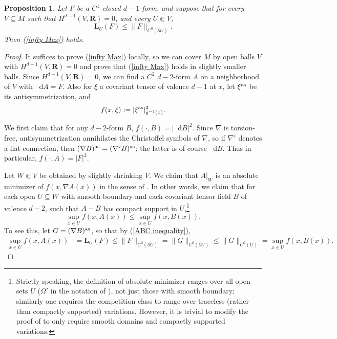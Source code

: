 \documentclass[reqno,11pt]{amsart}
\newcommand{\RR}{\mathbf{R}}
\newcommand*\dif{\mathop{}\!\mathrm{d}}
\newcommand{\Comass}{\mathbf L}
\newtheorem{proposition}[theorem]{Proposition}
\theoremstyle{definition}
\numberwithin{equation}{section}
\begin{document}
\begin{proposition}
Let $F$ be a $C^1$ closed $d - 1$-form, and suppose that for every $V \subseteq M$ such that $H^{d - 1}(V, \RR) = 0$, and every $U \Subset V$,
\begin{equation}\label{ABC inequality}
\Comass_U(F) \leq \|F\|_{C^0(\partial U)}.
\end{equation}
Then (\ref{infty Max}) holds.
\end{proposition}
\begin{proof}
It suffices to prove (\ref{infty Max}) locally, so we can cover $M$ by open balls $V$ with $H^{d - 1}(V, \RR) = 0$ and prove that (\ref{infty Max}) holds in slightly smaller balls.
Since $H^{d - 1}(V, \RR) = 0$, we can find a $C^2$ $d - 2$-form $A$ on a neighborhood of $\overline V$ with $\dif A = F$.
Also for $\xi$ a covariant tensor of valence $d - 1$ at $x$, let $\xi^{\rm as}$ be its antisymmetrization, and
$$f(x, \xi) := |\xi^{\rm as}|_{g^{-1}(x)}^2.$$

We first claim that for any $d - 2$-form $B$, $f(\cdot, B) = |\dif B|^2$.
Since $\nabla$ is torsion-free, antisymmetrization annihilates the Christoffel symbols of $\nabla$, so if $\nabla^\flat$ denotes a flat connection, then $(\nabla B)^{\rm as} = (\nabla^\flat B)^{\rm as}$; the latter is of course $\dif B$.
Thus in particular, $f(\cdot, A) = |F|^2$.

Let $W \Subset V$ be obtained by slightly shrinking $V$.
We claim that $A|_W$ is an absolute minimizer of $f(x, \nabla A(x))$ in the sense of \cite[Definition 5.1]{Barron2001}.
In other words, we claim that for each open $U \subseteq W$ with smooth boundary and each covariant tensor field $B$ of valence $d - 2$, such that $A - B$ has compact support in $U$,\footnote{Strictly speaking, the definition of absolute minimizer ranges over all open sets $U$ ($\Omega'$ in the notation of \cite{Barron2001}), not just those with smooth boundary; similarly one requires the competition class to range over traceless (rather than compactly supported) variations. However, it is trivial to modify the proof of \cite[Theorem 5.2]{Barron2001} to only require smooth domains and compactly supported variations.}
$$\sup_{x \in U} f(x, A(x)) \leq \sup_{x \in U} f(x, B(x)).$$
To see this, let $G = (\nabla B)^{\rm as}$, so that by (\ref{ABC inequality}),
\begin{align*}
\sup_{x \in U} f(x, A(x))
&= \Comass_U(F) \leq \|F\|_{C^0(\partial U)} = \|G\|_{C^0(\partial U)} \leq \|G\|_{C^0(U)} = \sup_{x \in U} f(x, B(x)).
\end{align*}


\end{proof}
\end{document}
